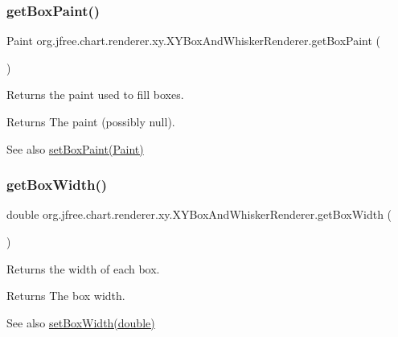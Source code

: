 \subsubsection{\texorpdfstring{get\+Box\+Paint()}{getBoxPaint()}}
{\footnotesize\ttfamily Paint org.\+jfree.\+chart.\+renderer.\+xy.\+X\+Y\+Box\+And\+Whisker\+Renderer.\+get\+Box\+Paint (\begin{DoxyParamCaption}{ }\end{DoxyParamCaption})}

Returns the paint used to fill boxes.

\begin{DoxyReturn}{Returns}
The paint (possibly {\ttfamily null}).
\end{DoxyReturn}
\begin{DoxySeeAlso}{See also}
\mbox{\hyperlink{classorg_1_1jfree_1_1chart_1_1renderer_1_1xy_1_1_x_y_box_and_whisker_renderer_a355259830b67806e031b3cda109cbbf9}{set\+Box\+Paint(\+Paint)}} 
\end{DoxySeeAlso}
\mbox{\label{classorg_1_1jfree_1_1chart_1_1renderer_1_1xy_1_1_x_y_box_and_whisker_renderer_a45c1aed1e263bd3a0078270316a6af6b}} 
\subsubsection{\texorpdfstring{get\+Box\+Width()}{getBoxWidth()}}
{\footnotesize\ttfamily double org.\+jfree.\+chart.\+renderer.\+xy.\+X\+Y\+Box\+And\+Whisker\+Renderer.\+get\+Box\+Width (\begin{DoxyParamCaption}{ }\end{DoxyParamCaption})}

Returns the width of each box.

\begin{DoxyReturn}{Returns}
The box width.
\end{DoxyReturn}
\begin{DoxySeeAlso}{See also}
\mbox{\hyperlink{classorg_1_1jfree_1_1chart_1_1renderer_1_1xy_1_1_x_y_box_and_whisker_renderer_a315ca989a335f58c5d08019fb3f519f8}{set\+Box\+Width(double)}} 
\end{DoxySeeAlso}
\mbox{\label{classorg_1_1jfree_1_1chart_1_1renderer_1_1xy_1_1_x_y_box_and_whisker_renderer_ae2f5164473482624816b46841f7462af}} 
